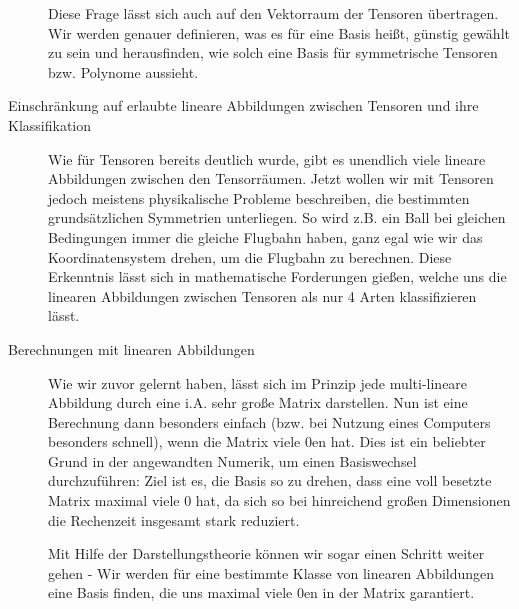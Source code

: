 \begin{description}
Diese Frage lässt sich auch auf den Vektorraum der Tensoren übertragen. Wir werden genauer definieren, was es für eine Basis heißt, günstig gewählt zu sein und herausfinden, wie solch eine Basis für symmetrische Tensoren bzw. Polynome aussieht.

\item[Einschränkung auf erlaubte lineare Abbildungen zwischen Tensoren und ihre Klassifikation]
Wie für Tensoren bereits deutlich wurde, gibt es unendlich viele lineare Abbildungen zwischen den Tensorräumen. Jetzt wollen wir mit Tensoren jedoch meistens physikalische Probleme beschreiben, die bestimmten grundsätzlichen Symmetrien unterliegen. So wird z.B. ein Ball bei gleichen Bedingungen immer die gleiche Flugbahn haben, ganz egal wie wir das Koordinatensystem drehen, um die Flugbahn zu berechnen. Diese Erkenntnis lässt sich in mathematische Forderungen gießen, welche uns die linearen Abbildungen zwischen Tensoren als nur 4 Arten klassifizieren lässt.

\item[Berechnungen mit linearen Abbildungen]
Wie wir zuvor gelernt haben, lässt sich im Prinzip jede multi-lineare Abbildung durch eine i.A. sehr große Matrix darstellen. Nun ist eine Berechnung dann besonders einfach (bzw. bei Nutzung eines Computers besonders schnell), wenn die Matrix viele 0en hat. Dies ist ein beliebter Grund in der angewandten Numerik, um einen Basiswechsel durchzuführen: Ziel ist es, die Basis so zu drehen, dass eine voll besetzte Matrix maximal viele 0 hat, da sich so bei hinreichend großen Dimensionen die Rechenzeit insgesamt stark reduziert. 

Mit Hilfe der Darstellungstheorie können wir sogar einen Schritt weiter gehen - Wir werden für eine bestimmte Klasse von linearen Abbildungen eine Basis finden, die uns maximal viele 0en in der Matrix garantiert.

\end{description}